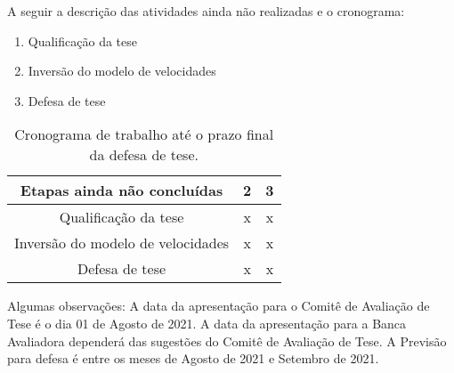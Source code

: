 A seguir a descrição das atividades ainda não realizadas e o cronograma:

  \begin{enumerate}
   \item Qualificação da tese
   \item Inversão do modelo de velocidades
   \item Defesa de tese
  \end{enumerate}
  
   \begin{table}[H]
      \caption{Cronograma de trabalho até o prazo final da defesa de tese.}
      \centering
      
      \begin{tabular}{|c|c|c|}

      \hline
      \textbf{Etapas ainda não concluídas} & 2 & 3 \\ \hline
      Qualificação da tese & x & x \\ \hline
      Inversão do modelo de velocidades & x & x \\ \hline
      Defesa de tese & x & x  \\
      \hline
      
      \end{tabular}
  \end{table}
  

Algumas observações: A data da apresentação para o Comitê de Avaliação de Tese é o dia 01 de Agosto de 2021.
A data da apresentação para a Banca Avaliadora dependerá das sugestões do
Comitê de Avaliação de Tese. A Previsão para defesa é entre os meses de Agosto de
2021 e Setembro de 2021.

